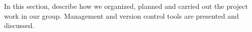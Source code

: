 
In this section, describe how we organized, planned and carried out the project work in our group. Management and version control tools are presented and discussed.